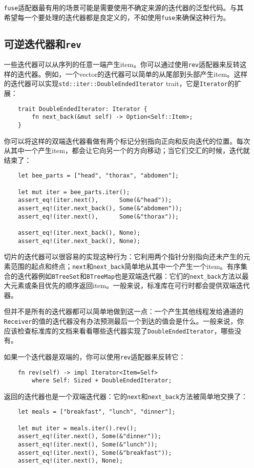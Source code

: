 \texttt{fuse}适配器最有用的场景可能是需要使用不确定来源的迭代器的泛型代码。与其希望每一个要处理的迭代器都是良定义的，不如使用\texttt{fuse}来确保这种行为。

\subsection{可逆迭代器和\texttt{rev}}
一些迭代器可以从序列的任意一端产生item。你可以通过使用\texttt{rev}适配器来反转这样的迭代器。例如，一个vector的迭代器可以简单的从尾部到头部产生item。这样的迭代器可以实现\texttt{std::iter::DoubleEndedIterator} trait，它是\texttt{Iterator}的扩展：
\begin{verbatim}
    trait DoubleEndedIterator: Iterator {
        fn next_back(&mut self) -> Option<Self::Item>;
    }
\end{verbatim}

你可以将这样的双端迭代器看做有两个标记分别指向正向和反向迭代的位置。每次从其中一个产生item，都会让它向另一个的方向移动；当它们交汇的时候，迭代就结束了：
\begin{verbatim}
    let bee_parts = ["head", "thorax", "abdomen"];

    let mut iter = bee_parts.iter();
    assert_eq!(iter.next(),      Some(&"head"));
    assert_eq!(iter.next_back(), Some(&"abdomen"));
    assert_eq!(iter.next(),      Some(&"thorax"));

    assert_eq!(iter.next_back(), None);
    assert_eq!(iter.next_back(), None);
\end{verbatim}

切片的迭代器可以很容易的实现这种行为：它利用两个指针分别指向还未产生的元素范围的起点和终点；\texttt{next}和\texttt{next\_back}简单地从其中一个产生一个item。有序集合的迭代器例如\texttt{BTreeSet}和\texttt{BTreeMap}也是双端迭代器：它们的\texttt{next\_back}方法以最大元素或条目优先的顺序返回item。一般来说，标准库在可行时都会提供双端迭代器。

但并不是所有的迭代器都可以简单地做到这一点：一个产生其他线程发给通道的\texttt{Receiver}的值的迭代器没有办法预测最后一个到达的值会是什么。一般来说，你应该检查标准库的文档来看看哪些迭代器实现了\texttt{DoubleEndedIterator}，哪些没有。

如果一个迭代器是双端的，你可以使用\texttt{rev}适配器来反转它：
\begin{verbatim}
    fn rev(self) -> impl Iterator<Item=Self>
        where Self: Sized + DoubleEndedIterator;
\end{verbatim}

返回的迭代器也是一个双端迭代器：它的\texttt{next}和\texttt{next\_back}方法被简单地交换了：
\begin{verbatim}
    let meals = ["breakfast", "lunch", "dinner"];

    let mut iter = meals.iter().rev();
    assert_eq!(iter.next(), Some(&"dinner"));
    assert_eq!(iter.next(), Some(&"lunch"));
    assert_eq!(iter.next(), Some(&"breakfast"));
    assert_eq!(iter.next(), None);
\end{verbatim}

